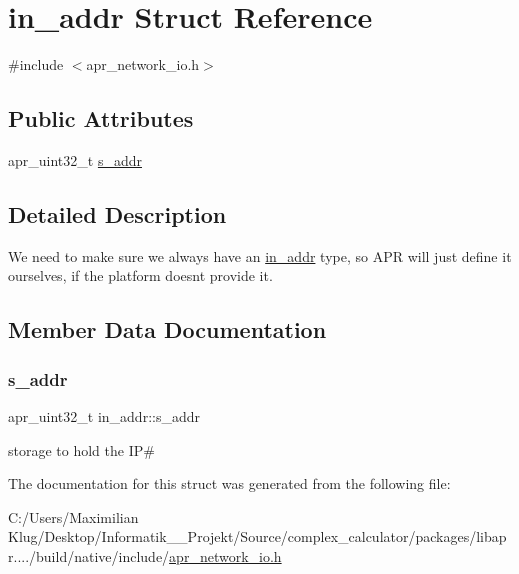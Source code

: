 \hypertarget{structin__addr}{}\section{in\+\_\+addr Struct Reference}
\label{structin__addr}


{\ttfamily \#include $<$apr\+\_\+network\+\_\+io.\+h$>$}

\subsection*{Public Attributes}
\begin{DoxyCompactItemize}
\item 
apr\+\_\+uint32\+\_\+t \mbox{\hyperlink{structin__addr_a1bf09b20f0531edf5da627f712561108}{s\+\_\+addr}}
\end{DoxyCompactItemize}


\subsection{Detailed Description}
We need to make sure we always have an \mbox{\hyperlink{structin__addr}{in\+\_\+addr}} type, so A\+PR will just define it ourselves, if the platform doesn\textquotesingle{}t provide it. 

\subsection{Member Data Documentation}
\mbox{\label{structin__addr_a1bf09b20f0531edf5da627f712561108}} 
\subsubsection{\texorpdfstring{s\+\_\+addr}{s\_addr}}
{\footnotesize\ttfamily apr\+\_\+uint32\+\_\+t in\+\_\+addr\+::s\+\_\+addr}

storage to hold the IP\# 

The documentation for this struct was generated from the following file\+:\begin{DoxyCompactItemize}
\item 
C\+:/\+Users/\+Maximilian Klug/\+Desktop/\+Informatik\+\_\+\_\+\+Projekt/\+Source/complex\+\_\+calculator/packages/libapr..../build/native/include/\mbox{\hyperlink{apr__network__io_8h}{apr\+\_\+network\+\_\+io.\+h}}\end{DoxyCompactItemize}
